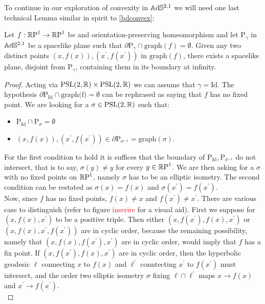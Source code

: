 To continue in our exploration of convexity in $\A^{2,1}$ we will need one last technical Lemma similar in spirit to \ref{bdconvex}: 
\begin{lemma}\label{convI}
    Let $f:\S\to\S$ be and orientation-preserving homeomorphism and let $\text{P}_\gamma$ in $\A^{2,1}$ be a spacelike plane such that $\partial\text{P}_\gamma\cap\text{graph}(f)=\emptyset.$ Given any two distinct points $(x,f(x)), (x^{\prime} ,f(x^{\prime} ))$ in $\text{graph}(f)$, there exists a spacelike plane, disjoint from P$_\gamma$, containing them in its boundary at infinity. 
\end{lemma}
\begin{proof}
    Acting via $\PSL\times\PSL$ we can assume that $\gamma=\text{Id}$. The hypothesis $\partial\text{P}_{\text{Id}}\cap\text{graph(f)}=\emptyset$ can be rephrased as saying that $f$ has no fixed point. We are looking for a $\sigma\in\PSL$ such that:
    \begin{itemize}
        \item P$_{\text{Id}}\cap\text{P}_\sigma=\emptyset$ 
        \item $(x,f(x)),(x^{\prime} ,f(x^{\prime}))\in\partial\text{P}_{\sigma^{-1}}=\text{graph}(\sigma).$
    \end{itemize}
    For the first condition to hold it is suffices that the boundary of $\text{P}_{\text{Id}},\text{P}_{\sigma^{-1}}$ do not intersect, that is to say, $\sigma(y)\neq y$ for every $y\in\S$. We are then asking for a $\sigma$ with no fixed points on $\S$, namely $\sigma$ has to be an elliptic isometry. The second condition can be restated as $\sigma(x)=f(x)$ and $\sigma(x^{\prime})=f(x^{\prime}).$\\
Now, since $f$ has no fixed points, $f(x)\neq x$ and $f(x^{\prime})\neq x^{\prime}$. There are various case to distinguish (refer to figure \textcolor{red}{inserire} for a visual aid). First we suppose for $(x,f(x),x^{\prime})$ to be a positive triple. Then either $(x,f(x^{\prime}),f(x),x^{\prime})$ or $(x,f(x),x^{\prime},f(x^{\prime}))$ are in cyclic order, because the remaining possibility, namely that $(x,f(x),f(x^{\prime}) ,x^{\prime})$ are in cyclic order, would imply that $f$ has a fix point.  If $(x,f(x^{\prime}),f(x),x^{\prime})$ are in cyclic order, then the hyperbolic geodesic $\ell$ connecting $x$ to $f(x)$ and $\ell^{\prime}$ conntecting $x^{\prime} $ to $f(x^{\prime})$ must intersect, and the order two elliptic isometry $\sigma$ fixing $\ell\cap\ell^{\prime}$ maps $x\to f(x)$ and $x^{\prime} \to f(x^{\prime})$.\\

\end{proof}
